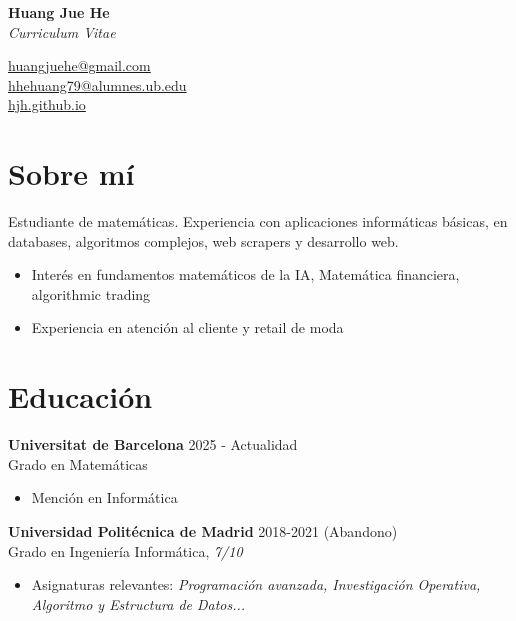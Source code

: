 \documentclass[11pt,a4paper]{article}
\newcommand{\link}[2]{\href{#1}{#2}}
\begin{document}
\sloppy

\noindent
\begin{minipage}[t]{0.5\textwidth}
    \Huge \textbf{Huang Jue He} \\[6pt]
    \large \textit{Curriculum Vitae}
\end{minipage}
\begin{minipage}[t]{0.5\textwidth}
    \raggedleft
    \link{mailto:huangjuehe@gmail.com}{huangjuehe@gmail.com} \\
    \link{mailto:hhehuang79@alumnes.ub.edu}{hhehuang79@alumnes.ub.edu} \\
    \link{https://hjh.github.io/}{hjh.github.io} \\
\end{minipage}

\section*{Sobre mí}
Estudiante de matemáticas. Experiencia con aplicaciones informáticas básicas, en databases, algoritmos complejos, web scrapers y desarrollo web.
\begin{itemize}[label=-]
    \item Interés en fundamentos matemáticos de la IA, Matemática financiera, algorithmic trading
    \item Experiencia en atención al cliente y retail de moda
\end{itemize}

\section*{Educación}

\textbf{Universitat de Barcelona} \hfill 2025 - Actualidad \\
Grado en Matemáticas
\begin{itemize}[label=-]
    \item Mención en Informática
\end{itemize}

\noindent
\textbf{Universidad Politécnica de Madrid} \hfill 2018-2021 (Abandono) \\
Grado en Ingeniería Informática, \textit{7/10}
\begin{itemize}[label=-]
    \item Asignaturas relevantes: \textit{Programación avanzada, Investigación Operativa, Algoritmo y Estructura de Datos...}
\end{itemize}
\end{document}
